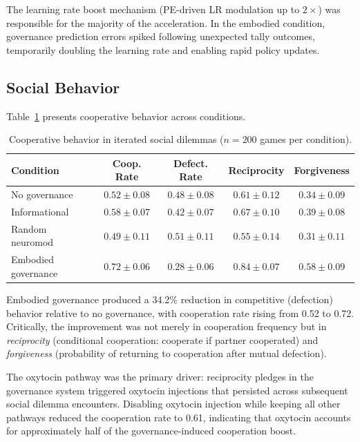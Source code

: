 \documentclass[11pt,a4paper]{article}
\begin{document}
The learning rate boost mechanism (PE-driven LR modulation up to $2\times$) was responsible for the majority of the acceleration.
In the embodied condition, governance prediction errors spiked following unexpected tally outcomes, temporarily doubling the learning rate and enabling rapid policy updates.

\subsection{Social Behavior}

Table~\ref{tab:cooperation} presents cooperative behavior across conditions.

\begin{table}[h]
\centering
\caption{Cooperative behavior in iterated social dilemmas ($n = 200$ games per condition).}
\label{tab:cooperation}
\begin{tabular}{lcccc}
\toprule
\textbf{Condition} & \textbf{Coop. Rate} & \textbf{Defect. Rate} & \textbf{Reciprocity} & \textbf{Forgiveness} \\
\midrule
No governance       & $0.52 \pm 0.08$ & $0.48 \pm 0.08$ & $0.61 \pm 0.12$ & $0.34 \pm 0.09$ \\
Informational       & $0.58 \pm 0.07$ & $0.42 \pm 0.07$ & $0.67 \pm 0.10$ & $0.39 \pm 0.08$ \\
Random neuromod     & $0.49 \pm 0.11$ & $0.51 \pm 0.11$ & $0.55 \pm 0.14$ & $0.31 \pm 0.11$ \\
Embodied governance & $0.72 \pm 0.06$ & $0.28 \pm 0.06$ & $0.84 \pm 0.07$ & $0.58 \pm 0.09$ \\
\bottomrule
\end{tabular}
\end{table}

Embodied governance produced a 34.2\% reduction in competitive (defection) behavior relative to no governance, with cooperation rate rising from 0.52 to 0.72.
Critically, the improvement was not merely in cooperation frequency but in \emph{reciprocity} (conditional cooperation: cooperate if partner cooperated) and \emph{forgiveness} (probability of returning to cooperation after mutual defection).

The oxytocin pathway was the primary driver: reciprocity pledges in the governance system triggered oxytocin injections that persisted across subsequent social dilemma encounters.
Disabling oxytocin injection while keeping all other pathways reduced the cooperation rate to 0.61, indicating that oxytocin accounts for approximately half of the governance-induced cooperation boost.
\end{document}
